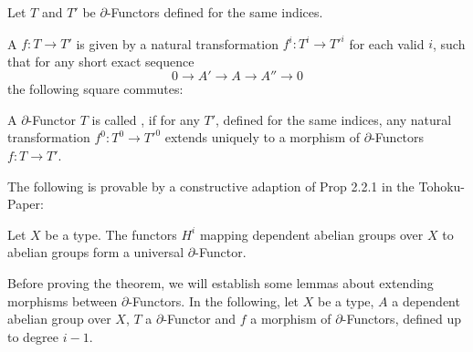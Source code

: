 \begin{definition}
  Let $T$ and $T'$ be $\partial$-Functors defined for the same indices.
  
  A  $f:T\to T'$ is given by a natural transformation $f^i:T^i\to T'^i$ for each valid $i$,
  such that for any short exact sequence
  \[ 0\to A'\to A\to A''\to 0\]
  the following square commutes:
  \begin{center}
  \end{center}
\end{definition}

\begin{definition}
  A $\partial$-Functor $T$ is called , if for any $T'$, defined for the same indices,
  any natural transformation $f^0:T^0\to T'^0$ extends uniquely to a morphism of $\partial$-Functors $f:T\to T'$.
\end{definition}

The following is provable by a constructive adaption of Prop 2.2.1 in the Tohoku-Paper:
\begin{theorem}
  \label{thm:universal}
  Let $X$ be a type.
  The functors $H^i$ mapping dependent abelian groups over $X$ to abelian groups form a universal $\partial$-Functor.
\end{theorem}

Before proving the theorem, we will establish some lemmas about extending morphisms between $\partial$-Functors.
In the following, let $X$ be a type, $A$ a dependent abelian group over $X$, $T$ a $\partial$-Functor and $f$ a morphism of $\partial$-Functors, defined up to degree $i-1$.

